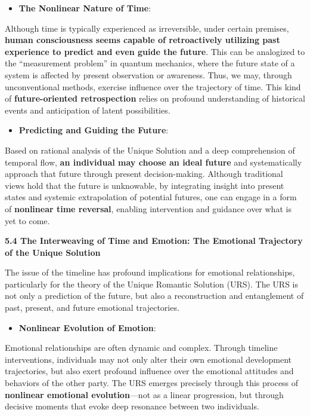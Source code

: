 \documentclass[
]{article}
\begin{document}
\begin{itemize}
\item
  \textbf{The Nonlinear Nature of Time}:
\end{itemize}

Although time is typically experienced as irreversible, under certain
premises, \textbf{human consciousness seems capable of retroactively
utilizing past experience to predict and even guide the future}. This
can be analogized to the ``measurement problem'' in quantum mechanics,
where the future state of a system is affected by present observation or
awareness. Thus, we may, through unconventional methods, exercise
influence over the trajectory of time. This kind of
\textbf{future-oriented retrospection} relies on profound understanding
of historical events and anticipation of latent possibilities.

\begin{itemize}
\item
  \textbf{Predicting and Guiding the Future}:
\end{itemize}

Based on rational analysis of the Unique Solution and a deep
comprehension of temporal flow, \textbf{an individual may choose an
ideal future} and systematically approach that future through present
decision-making. Although traditional views hold that the future is
unknowable, by integrating insight into present states and systemic
extrapolation of potential futures, one can engage in a form of
\textbf{nonlinear time reversal}, enabling intervention and guidance
over what is yet to come.

\textbf{5.4 The Interweaving of Time and Emotion: The Emotional
Trajectory of the Unique Solution}

The issue of the timeline has profound implications for emotional
relationships, particularly for the theory of the Unique Romantic
Solution (URS). The URS is not only a prediction of the future, but also
a reconstruction and entanglement of past, present, and future emotional
trajectories.

\begin{itemize}
\item
  \textbf{Nonlinear Evolution of Emotion}:
\end{itemize}

Emotional relationships are often dynamic and complex. Through timeline
interventions, individuals may not only alter their own emotional
development trajectories, but also exert profound influence over the
emotional attitudes and behaviors of the other party. The URS emerges
precisely through this process of \textbf{nonlinear emotional
evolution}---not as a linear progression, but through decisive moments
that evoke deep resonance between two individuals.
\end{document}

